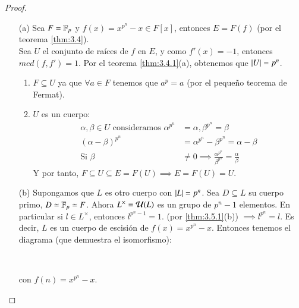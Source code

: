 \begin{proof}$ $
    \begin{itemize}
        \item[(a)] Sea $F = \mathbb{F}_p$ y $f(x) = x^{p^n} - x \in F[x]$, entonces $E = F(f)$ (por el teorema \ref{thm:3.4}).\\
        Sea $U$ el conjunto de raíces de $f$ en $E$, y como $f'(x) = -1$, entonces $mcd(f, f') = 1$. Por el teorema \ref{thm:3.4.1}(a), obtenemos que $\left|U\right| = p^n$.\\

        \begin{enumerate}
            \item $F \subseteq U$ ya que $\forall a \in F$ tenemos que $a^p = a$ (por el pequeño teorema de Fermat).
            \item $U$ es un cuerpo:
            \begin{align*}
                \alpha, \beta \in U \text{ consideramos } \alpha^{p^n} &= \alpha, \beta^{p^n} = \beta \\
                (\alpha-\beta)^{p^n} &= \alpha^{p^n} - \beta^{p^n} = \alpha - \beta \\
                \text{Si } \beta &\neq 0 \implies \frac{\alpha^{p^n}}{\beta^{p^n}} = \frac{\alpha}{\beta}
            \end{align*}
            Y por tanto, $F \subseteq U \subseteq E = F(U) \implies E = F(U) = U$.
        \end{enumerate}
        \item[(b)] Supongamos que $L$ es otro cuerpo con $\left|L\right| = p^n$. Sea $D \subseteq L$ su cuerpo primo, $D \simeq \mathbb{F}_p \simeq F$. Ahora $L^\times = \mathcal{U}(L)$ es un grupo de $p^n - 1$ elementos. En particular si $l \in L^\times$, entonces $l^{p^n-1} = 1$. (por \ref{thm:3.5.1}(b)) $\implies l^{p^n} = l$. Es decir, $L$ es un cuerpo de escisión de $f(x) = x^{p^n} - x$. Entonces tenemos el diagrama (que demuestra el isomorfismo):
        
        \begin{center}
            \\
        \end{center}
        con $f(n) = x^{p^n} -  x$.
    \end{itemize}
\end{proof}

